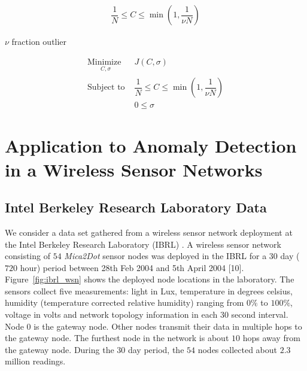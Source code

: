 \documentclass[3p,times]{elsarticle}
\begin{document}
\cite{scholkopf2001estimating}

\cite{Xiao2015}

\begin{align}
\dfrac{1}{N} \le C \le \min \left( 1, \dfrac{1}{\nu N} \right)
\end{align}

$\nu$ fraction outlier

\begin{subequations}
\begin{align}
\underset{
	\begin{array}{c}
		 C, \sigma
	\end{array}}{\text{Minimize }} & J\left( C, \sigma \right)\\
\text{Subject to } & \dfrac{1}{N} \le C \le \min \left( 1, \dfrac{1}{\nu N} \right) \\
& 0 \le \sigma
\end{align}
\end{subequations}

\section{Application to Anomaly Detection in a Wireless Sensor Networks}

\cite{Suthaharan2010}

\subsection{Intel Berkeley Research Laboratory Data}

We consider a data set gathered from a wireless sensor network deployment at the Intel Berkeley Research Laboratory (IBRL) \cite{Buonadonna2005}. A wireless sensor network consisting of $54$ \emph{Mica2Dot} sensor nodes was deployed in the IBRL for a $30$ day ($720$ hour) period between 28th Feb 2004 and 5th April 2004 [10]. Figure~\ref{fig:ibrl_wsn} shows the deployed node locations in the laboratory. The sensors collect five measurements: light in Lux, temperature in degrees celsius, humidity (temperature corrected relative humidity) ranging from $0\%$ to $100\%$, voltage in volts and network topology information in each $30$ second interval. Node $0$ is the gateway node. Other nodes transmit their data in multiple hops to the gateway node. The furthest node in the network is about $10$ hops away from the gateway node. During the $30$ day period, the $54$ nodes collected about $2.3$ million readings.
\end{document}
